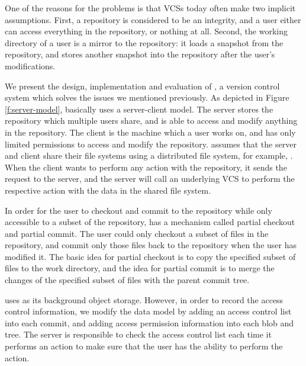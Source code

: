 One of the reasons for the problems is that VCSs today often
make two implicit assumptions. First, a repository is considered to be
an integrity, and a user either can access everything in the repository, or
nothing at all. Second, the working directory of a user is a mirror to the
repository: it loads a snapshot from the repository, and stores another snapshot
into the repository after the user's modifications. 



We present the design, implementation and evaluation of \sys, a version control
system which solves the issues we mentioned previously. As depicted in Figure
\ref{f:server-model}, \sys basically
uses a server-client model. The server stores the repository which multiple
users share, and is able to access and modify anything in the
repository. The client is the machine which a user works on, and has only
limited permissions to access and modify the repository. \sys assumes that the
server and client share their file systems using a distributed file system, for
example,
\nfs. %
When the client wants to perform any action with the repository, it sends the
request to the server, and the server will call an underlying VCS to perform
the respective action with the data in the shared file system.

In order for the user to checkout and commit to the repository while only
accessible to a subset of the repository, \sys has a mechanism called partial
checkout and partial commit. The user could only checkout a subset of files in
the repository, and commit only those files back to the repository when the user
has modified it. The basic idea for partial checkout is to copy the specified
subset of files to the work directory, and the idea for partial commit is to
merge the changes of the specified subset of files with the parent commit tree.

\sys uses \git as its background object storage. However, in order to record the
access control information, we modify the data model by adding an access control
list into each commit, and adding access permission information into each blob
and tree. The server is responsible to check the
access control list each time it performs an action to make sure that the user
has the ability to perform the action.

